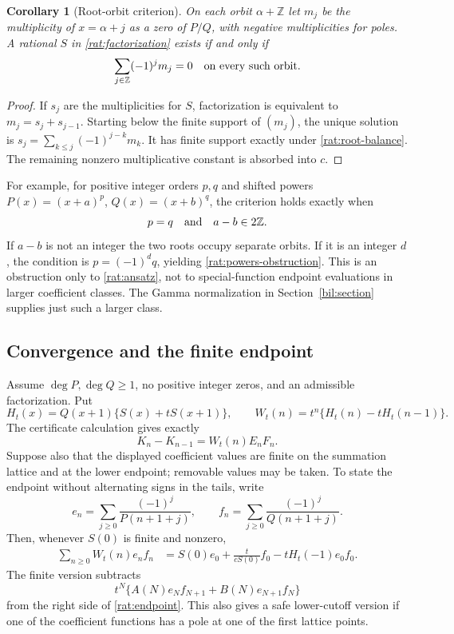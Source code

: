 \documentclass[11pt]{article}
\newtheorem{corollary}[theorem]{Corollary}
\theoremstyle{definition}
\theoremstyle{remark}
\numberwithin{equation}{section}
\begin{document}
\begin{corollary}[Root-orbit criterion]\label{rat:root-orbits}
On each orbit $\alpha+\mathbb Z$ let $m_j$ be the multiplicity of
$x=\alpha+j$ as a zero of $P/Q$, with negative multiplicities for
poles. A rational $S$ in \eqref{rat:factorization} exists if and only if
\begin{equation}\label{rat:root-balance}
 \sum_{j\in\mathbb Z}(-1)^jm_j=0
 \quad\hbox{on every such orbit}.
\end{equation}
\end{corollary}
\begin{proof}
If $s_j$ are the multiplicities for $S$, factorization is equivalent
to $m_j=s_j+s_{j-1}$. Starting below the finite support of $(m_j)$,
the unique solution is
$s_j=\sum_{k\le j}(-1)^{j-k}m_k$. It has finite support exactly
under \eqref{rat:root-balance}. The remaining nonzero multiplicative
constant is absorbed into $c$.
\end{proof}

For example, for positive integer orders $p,q$ and shifted powers
$P(x)=(x+a)^p$, $Q(x)=(x+b)^q$, the criterion holds exactly when
\begin{equation}\label{rat:powers-obstruction}
 p=q\quad\hbox{and}\quad a-b\in2\mathbb Z.
\end{equation}
If $a-b$ is not an integer the two roots occupy separate orbits.
If it is an integer $d$, the condition is $p=(-1)^dq$, yielding
\eqref{rat:powers-obstruction}. This is an obstruction only to
\eqref{rat:ansatz}, not to special-function endpoint evaluations in
larger coefficient classes. The Gamma normalization in
Section~\ref{bil:section} supplies just such a larger class.

\subsection{Convergence and the finite endpoint}

Assume $\deg P,\deg Q\ge1$, no positive integer zeros, and an
admissible factorization. Put
\[
 H_t(x)=Q(x+1)\{S(x)+tS(x+1)\},\qquad
 W_t(n)=t^n\{H_t(n)-tH_t(n-1)\}.
\]
The certificate calculation gives exactly
\begin{equation}\label{rat:finite-difference}
 K_n-K_{n-1}=W_t(n)E_nF_n.
\end{equation}
Suppose also that the displayed coefficient values are finite on the
summation lattice and at the lower endpoint; removable values may be
taken. To state the endpoint without alternating signs in the tails,
write
\[
 e_n=\sum_{j\ge0}\frac{(-1)^j}{P(n+1+j)},\qquad
 f_n=\sum_{j\ge0}\frac{(-1)^j}{Q(n+1+j)}.
\]
Then, whenever $S(0)$ is finite and nonzero,
\begin{align}
 \sum_{n\ge0}W_t(n)e_nf_n
 &=S(0)e_0+\frac{t}{cS(0)}f_0
       -tH_t(-1)e_0f_0.\label{rat:endpoint}
\end{align}
The finite version subtracts
\[
 t^N\{A(N)e_Nf_{N+1}+B(N)e_{N+1}f_N\}
\]
from the right side of \eqref{rat:endpoint}. This also gives a
safe lower-cutoff version if one of the coefficient functions has a
pole at one of the first lattice points.
\end{document}

